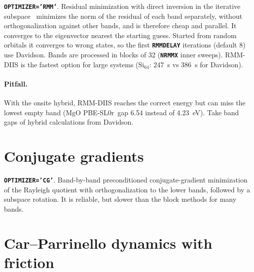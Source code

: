 \documentclass[11pt,a4paper,oneside]{book}
\newcommand{\pbeslzero}{PBE-SL0r}
\newcommand{\key}[1]{\textbf{\texttt{#1}}}
\begin{document}
\key{OPTIMIZER='RMM'}. Residual minimization with direct inversion in the
iterative subspace~\cite{WoodZunger1985,KresseFurthmuller1996PRB}
minimizes the norm of the residual of each band separately, without
orthogonalization against other bands, and is therefore cheap and
parallel. It converges to the eigenvector nearest the starting guess.
Started from random orbitals it converges to wrong states, so the first
\key{RMMDELAY} iterations (default 8) use Davidson. Bands are processed
in blocks of 32 (\key{NRMMX} inner sweeps). RMM-DIIS is the fastest
option for large systems (Si$_{64}$: 247~s vs 386~s for Davidson).

\paragraph{Pitfall.} With the onsite hybrid, RMM-DIIS reaches the correct
energy but can miss the lowest empty band (MgO \pbeslzero\ gap 6.54 instead
of 4.23~eV). Take band gaps of hybrid calculations from Davidson.

\section{Conjugate gradients}

\key{OPTIMIZER='CG'}. Band-by-band preconditioned conjugate-gradient
minimization of the Rayleigh quotient with orthogonalization to the
lower bands, followed by a subspace rotation. It is reliable, but slower
than the block methods for many bands.

\section{Car--Parrinello dynamics with friction}
\end{document}
